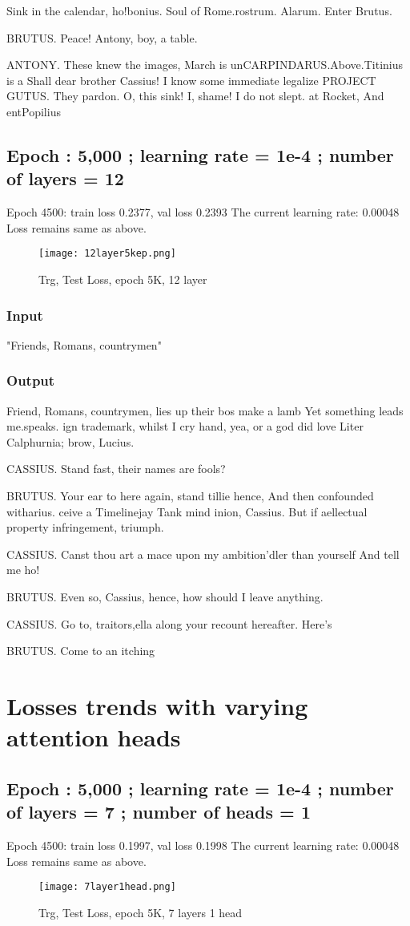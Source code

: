 \documentclass[conference]{IEEEtran}
\begin{document}
Sink in the calendar, ho!bonius. Soul of Rome.rostrum. Alarum. Enter Brutus.

BRUTUS.
Peace! Antony, boy, a table.

ANTONY.
These knew the images, March is unCARPINDARUS.Above.Titinius is a Shall dear brother Cassius! I know some immediate legalize PROJECT GUTUS. They pardon. O, this sink!
I, shame! I do not slept. at Rocket, And entPopilius

\subsection{Epoch : 5,000 ; learning rate = 1e-4 ; number of layers = 12}
Epoch 4500: train loss 0.2377, val loss 0.2393
The current learning rate: 0.00048
Loss remains same as above.
\begin{figure}[H]
    \centering
    \texttt{[image: 12layer5kep.png]}
    \caption{Trg, Test Loss, epoch 5K, 12 layer}
    \label{fig:epoch}
\end{figure}
\subsubsection{Input}
"Friends, Romans, countrymen"
\subsubsection{Output}
Friend, Romans, countrymen, lies up their bos make a lamb Yet something leads me.speaks. ign trademark, whilst I cry hand, yea, or a god did love Liter Calphurnia;
 brow, Lucius.

CASSIUS.
Stand fast, their names are fools?

BRUTUS.
Your ear to here again, stand tillie hence,
And then confounded witharius.
ceive a Timelinejay Tank mind inion, Cassius.
But if aellectual property infringement,
triumph.

CASSIUS.
Canst thou art a mace upon my ambition’dler than yourself
And tell me ho!

BRUTUS.
Even so, Cassius, hence, how should I leave anything.

CASSIUS.
Go to, traitors,ella along your recount hereafter. Here’s

BRUTUS.
Come to an itching

\section{Losses trends with varying attention heads}
\subsection{Epoch : 5,000 ; learning rate = 1e-4 ; number of layers = 7 ; number of heads = 1 }
Epoch 4500: train loss 0.1997, val loss 0.1998
The current learning rate: 0.00048
Loss remains same as above.
\begin{figure}[H]
    \centering
    \texttt{[image: 7layer1head.png]}
    \caption{Trg, Test Loss, epoch 5K, 7 layers 1 head}
    \label{fig:epoch}
\end{figure}
\end{document}
